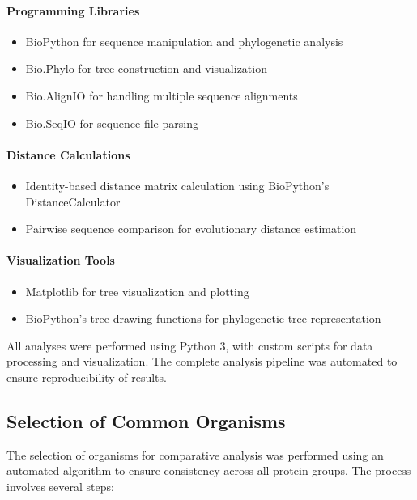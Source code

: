 \documentclass[11pt, a4paper, hidelinks]{article}
\begin{document}
\paragraph{Programming Libraries}
\begin{itemize}
    \item BioPython for sequence manipulation and phylogenetic analysis
    \item Bio.Phylo for tree construction and visualization
    \item Bio.AlignIO for handling multiple sequence alignments
    \item Bio.SeqIO for sequence file parsing
\end{itemize}

\paragraph{Distance Calculations}
\begin{itemize}
    \item Identity-based distance matrix calculation using BioPython's DistanceCalculator
    \item Pairwise sequence comparison for evolutionary distance estimation
\end{itemize}

\paragraph{Visualization Tools}
\begin{itemize}
    \item Matplotlib for tree visualization and plotting
    \item BioPython's tree drawing functions for phylogenetic tree representation
\end{itemize}

All analyses were performed using Python 3, with custom scripts for data processing and visualization. The complete analysis pipeline was automated to ensure reproducibility of results.

\subsection{Selection of Common Organisms}\label{subsec:selection-of-common-organisms}

The selection of organisms for comparative analysis was performed using an automated algorithm to ensure consistency across all protein groups. The process involves several steps:
\end{document}
